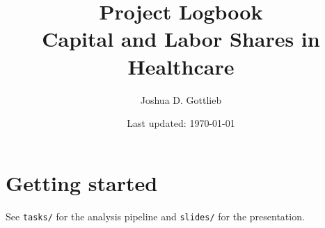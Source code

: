 \documentclass[11pt]{article}
\title{Project Logbook\\Capital and Labor Shares in Healthcare}
\author{Joshua D. Gottlieb}
\date{Last updated: \today}
\begin{document}
\maketitle
\tableofcontents

\section{Getting started}

See \texttt{tasks/} for the analysis pipeline and \texttt{slides/} for
the presentation.

% 
\end{document}
